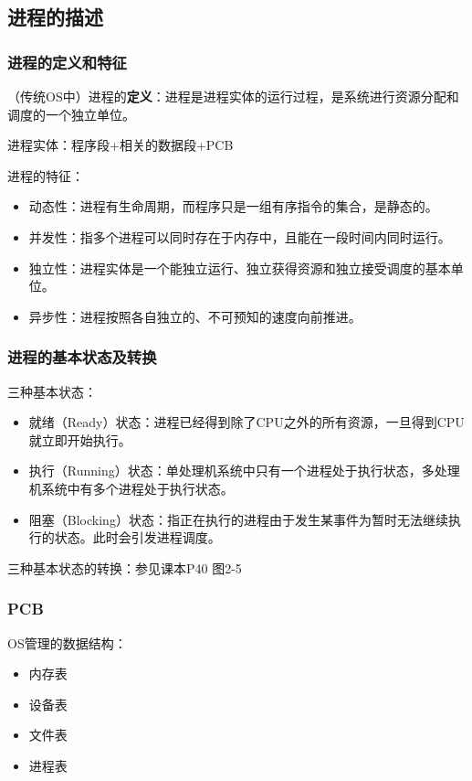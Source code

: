 \documentclass[12pt, a4paper, oneside]{ctexart}
\begin{document}
\subsection{进程的描述}

\subsubsection{进程的定义和特征}

（传统OS中）进程的\textbf{定义}：进程是进程实体的运行过程，是系统进行资源分配和调度的一个独立单位。

进程实体：程序段+相关的数据段+PCB

进程的特征：
\begin{itemize}
    \item 动态性：进程有生命周期，而程序只是一组有序指令的集合，是静态的。
    \item 并发性：指多个进程可以同时存在于内存中，且能在一段时间内同时运行。
    \item 独立性：进程实体是一个能独立运行、独立获得资源和独立接受调度的基本单位。
    \item 异步性：进程按照各自独立的、不可预知的速度向前推进。
\end{itemize}

\subsubsection{进程的基本状态及转换}

三种基本状态：
\begin{itemize}
    \item 就绪（Ready）状态：进程已经得到除了CPU之外的所有资源，一旦得到CPU就立即开始执行。
    \item 执行（Running）状态：单处理机系统中只有一个进程处于执行状态，多处理机系统中有多个进程处于执行状态。
    \item 阻塞（Blocking）状态：指正在执行的进程由于发生某事件为暂时无法继续执行的状态。此时会引发进程调度。
\end{itemize}

三种基本状态的转换：参见课本P40 图2-5

\subsubsection{PCB}

OS管理的数据结构：
\begin{itemize}
    \item 内存表
    \item 设备表
    \item 文件表
    \item 进程表
\end{itemize}
\end{document}
